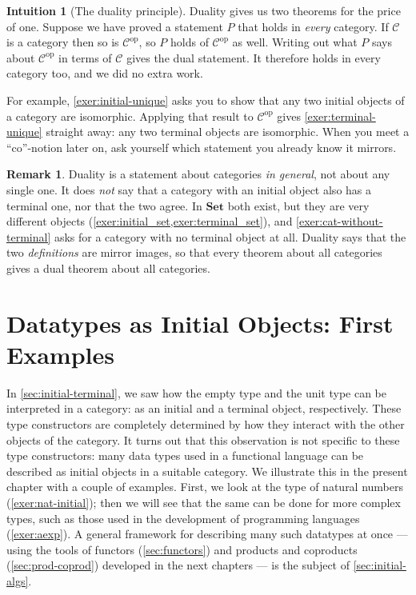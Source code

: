 \documentclass[a4paper,11pt, oneside,titlepage=false]{scrbook}
\theoremstyle{plain}
\theoremstyle{definition}
\newtheorem{rem}[thm]{Remark}
\newtheorem{intu}[thm]{Intuition}
\newcommand{\Cat}[1]{\mathcal{#1}}
\newcommand{\CC}{\Cat{C}}
\newcommand{\Catb}[1]{\mathbf{#1}}
\newcommand{\SET}{\Catb{Set}}
\newcommand{\op}[1]{\ensuremath{{#1}^\text{op}}}
\begin{document}
\begin{intu}[The duality principle]
  Duality gives us two theorems for the price of one.
  Suppose we have proved a statement $P$ that holds in \emph{every} category.
  If $\CC$ is a category then so is $\op\CC$, so $P$ holds of $\op\CC$ as well.
  Writing out what $P$ says about $\op\CC$ in terms of $\CC$ gives the dual
  statement.
  It therefore holds in every category too, and we did no extra work.

  For example, \cref{exer:initial-unique} asks you to show that any two initial
  objects of a category are isomorphic.
  Applying that result to $\op\CC$ gives \cref{exer:terminal-unique} straight
  away: any two terminal objects are isomorphic.
  When you meet a ``co''-notion later on, ask yourself which statement you
  already know it mirrors.
\end{intu}

\begin{rem}
  Duality is a statement about categories \emph{in general}, not about any
  single one.
  It does \emph{not} say that a category with an initial object also has a
  terminal one, nor that the two agree.
  In $\SET$ both exist, but they are very different objects
  (\cref{exer:initial_set,exer:terminal_set}), and
  \cref{exer:cat-without-terminal} asks for a category with no terminal object
  at all.
  Duality says that the two \emph{definitions} are mirror images, so that every
  theorem about all categories gives a dual theorem about all categories.
\end{rem}


\chapter{Datatypes as Initial Objects: First Examples}
\label{sec:examples}

In \cref{sec:initial-terminal}, we saw how the empty type and the unit type can be
interpreted in a category: as an initial and a terminal object, respectively.
These type constructors are completely determined by how they interact with the
other objects of the category.
It turns out that this observation is not specific to these type constructors:
many data types used in a functional language can be described as initial objects
in a suitable category.
We illustrate this in the present chapter with a couple of examples.
First, we look at the type of natural numbers (\cref{exer:nat-initial});
then we will see that the same can be done for more complex types, such as those
used in the development of programming languages (\cref{exer:aexp}).
A general framework for describing many such datatypes at once --- using the tools
of functors (\cref{sec:functors}) and products and coproducts
(\cref{sec:prod-coprod}) developed in the next chapters --- is the subject of
\cref{sec:initial-algs}.
\end{document}
